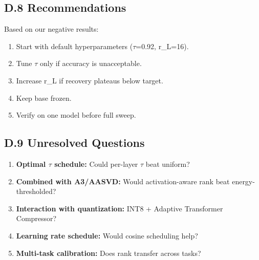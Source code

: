 \subsection{D.8 Recommendations}

Based on our negative results:

\begin{enumerate}
\item Start with default hyperparameters ($\tau$=0.92, r\_L=16).
\item Tune $\tau$ only if accuracy is unacceptable.
\item Increase r\_L if recovery plateaus below target.
\item Keep base frozen.
\item Verify on one model before full sweep.

\end{enumerate}
\subsection{D.9 Unresolved Questions}

\begin{enumerate}
\item \textbf{Optimal $\tau$ schedule:} Could per-layer $\tau$ beat uniform?
\item \textbf{Combined with A3/AASVD:} Would activation-aware rank beat
  energy-thresholded?
\item \textbf{Interaction with quantization:} INT8 + Adaptive Transformer Compressor?
\item \textbf{Learning rate schedule:} Would cosine scheduling help?
\item \textbf{Multi-task calibration:} Does rank transfer across tasks?
\end{enumerate}